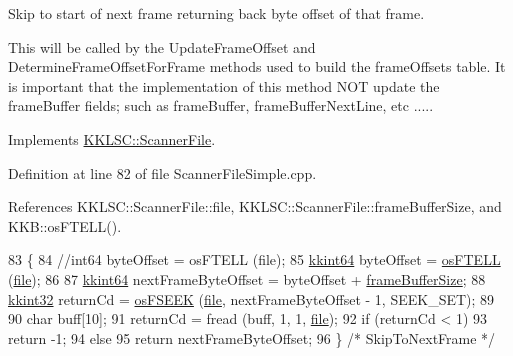 Skip to start of next frame returning back byte offset of that frame. 

This will be called by the \textquotesingle{}Update\+Frame\+Offset\textquotesingle{} and \textquotesingle{}Determine\+Frame\+Offset\+For\+Frame\textquotesingle{} methods used to build the \textquotesingle{}frame\+Offsets\textquotesingle{} table. It is important that the implementation of this method N\+OT update the frame\+Buffer fields; such as \textquotesingle{}frame\+Buffer\textquotesingle{}, \textquotesingle{}frame\+Buffer\+Next\+Line\textquotesingle{}, etc ..... 

Implements \hyperlink{class_k_k_l_s_c_1_1_scanner_file_a1797e4ba35b312c53da2c453f1303f35}{K\+K\+L\+S\+C\+::\+Scanner\+File}.



Definition at line 82 of file Scanner\+File\+Simple.\+cpp.



References K\+K\+L\+S\+C\+::\+Scanner\+File\+::file, K\+K\+L\+S\+C\+::\+Scanner\+File\+::frame\+Buffer\+Size, and K\+K\+B\+::os\+F\+T\+E\+L\+L().


\begin{DoxyCode}
83 \{
84   \textcolor{comment}{//int64  byteOffset = osFTELL (file);}
85   \hyperlink{namespace_k_k_b_aa3486b1c5ea9162b3b020c69f72826eb}{kkint64}  byteOffset = \hyperlink{namespace_k_k_b_a2cc11a5ae09d10d69ad751b549e5d94e}{osFTELL} (\hyperlink{class_k_k_l_s_c_1_1_scanner_file_a26db15f7823ce67b1621da17468ec807}{file});
86 
87   \hyperlink{namespace_k_k_b_aa3486b1c5ea9162b3b020c69f72826eb}{kkint64}  nextFrameByteOffset = byteOffset + \hyperlink{class_k_k_l_s_c_1_1_scanner_file_a101cdb2a0320f6aaefcabadc585beb34}{frameBufferSize};
88   \hyperlink{namespace_k_k_b_a8fa4952cc84fda1de4bec1fbdd8d5b1b}{kkint32}  returnCd = \hyperlink{namespace_k_k_b_a35eb0ca9cb253fcc536713ce903ed671}{osFSEEK} (\hyperlink{class_k_k_l_s_c_1_1_scanner_file_a26db15f7823ce67b1621da17468ec807}{file}, nextFrameByteOffset - 1, SEEK\_SET);
89 
90   \textcolor{keywordtype}{char} buff[10];
91   returnCd = fread (buff, 1, 1, \hyperlink{class_k_k_l_s_c_1_1_scanner_file_a26db15f7823ce67b1621da17468ec807}{file});
92   \textcolor{keywordflow}{if}  (returnCd < 1)
93     \textcolor{keywordflow}{return} -1;
94   \textcolor{keywordflow}{else}
95     \textcolor{keywordflow}{return} nextFrameByteOffset;
96 \}  \textcolor{comment}{/* SkipToNextFrame */}
\end{DoxyCode}
